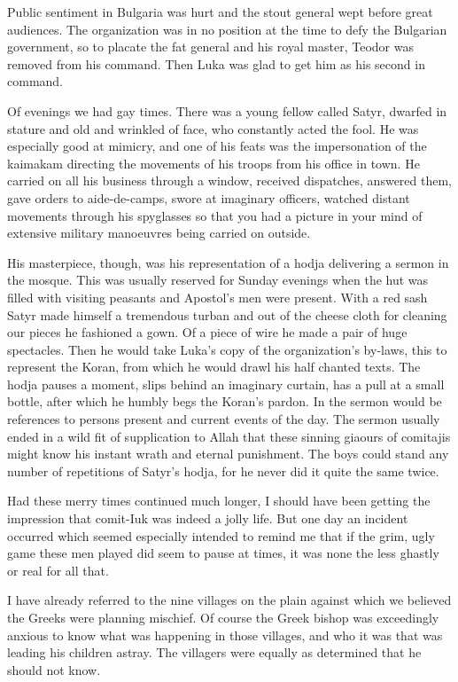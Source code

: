 \documentclass[a5paper,12pt]{book}
\begin{document}
Public sentiment in Bulgaria was hurt and the stout general wept before great audiences. The organization was in no position at the time to defy the Bulgarian government, so to placate the fat general and his royal master, Teodor was removed from his command. Then Luka was glad to get him as his second in command.

Of evenings we had gay times. There was a young fellow called Satyr, dwarfed in stature and old and wrinkled of face, who constantly acted the fool. He was especially good at mimicry, and one of his feats was the impersonation of the kaimakam directing the movements of his troops from his office in town. He carried on all his business through a window, received dispatches, answered them, gave orders to aide-de-camps, swore at imaginary officers, watched distant movements through his spyglasses so that you had a picture in your mind of extensive military manoeuvres being carried on outside.

His masterpiece, though, was his representation of a hodja delivering a sermon in the mosque. This was usually reserved for Sunday evenings when the hut was filled with visiting peasants and Apostol’s men were present. With a red sash Satyr made himself a tremendous turban and out of the cheese cloth for cleaning our pieces he fashioned a gown. Of a piece of wire he made a pair of huge spectacles.
Then he would take Luka’s copy of the organization’s by-laws, this to represent the Koran, from which he would drawl his half chanted texts. The hodja pauses a moment, slips behind an imaginary curtain, has a pull at a small bottle, after which he humbly begs the Koran’s pardon. In the sermon would be references to persons present and current events of the day. The sermon usually ended in a wild fit of supplication to Allah that these sinning giaours of comitajis might know his instant wrath and eternal punishment. The boys could stand any number of repetitions of Satyr’s hodja, for he never did it quite the same twice. 

Had these merry times continued much longer, I should have been getting the impression that comit-Iuk was indeed a jolly life. But one day an incident occurred which seemed especially intended to remind me that if the grim, ugly game these men played did seem to pause at times, it was none the less ghastly or real for all that. 

I have already referred to the nine villages on the plain against which we believed the Greeks were planning mischief. Of course the Greek bishop was exceedingly anxious to know what was happening in those villages, and who it was that was leading his children astray. The villagers were equally as determined that he should not know. 
\end{document}
